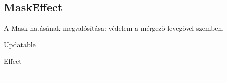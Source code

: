 \subsection{MaskEffect}
\begin{class-template-responsibility}
    A Mask hatásának megvalósítása: védelem a mérgező levegővel szemben.
\end{class-template-responsibility}
\begin{class-template-interface}
    Updatable
\end{class-template-interface}
\begin{class-template-baseclass}
    Effect
\end{class-template-baseclass}
\begin{class-template-attribute}
    -
\end{class-template-attribute}
\begin{class-template-method}
\end{class-template-method}

